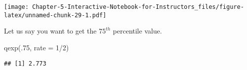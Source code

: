 \documentclass[
]{article}
\newenvironment{Shaded}{\begin{snugshade}}{\end{snugshade}}
\newcommand{\AttributeTok}[1]{\textcolor[rgb]{0.77,0.63,0.00}{#1}}
\newcommand{\DecValTok}[1]{\textcolor[rgb]{0.00,0.00,0.81}{#1}}
\newcommand{\FunctionTok}[1]{\textcolor[rgb]{0.00,0.00,0.00}{#1}}
\newcommand{\NormalTok}[1]{#1}
\newcommand{\SpecialCharTok}[1]{\textcolor[rgb]{0.00,0.00,0.00}{#1}}
\begin{document}
\texttt{[image: Chapter-5-Interactive-Notebook-for-Instructors\_files/figure-latex/unnamed-chunk-29-1.pdf]}

Let us say you want to get the \(75^{th}\) percentile value.

\begin{Shaded}
\begin{Highlighting}[]
\FunctionTok{qexp}\NormalTok{(.}\DecValTok{75}\NormalTok{, }\AttributeTok{rate =} \DecValTok{1}\SpecialCharTok{/}\DecValTok{2}\NormalTok{)}
\end{Highlighting}
\end{Shaded}

\begin{verbatim}
## [1] 2.773
\end{verbatim}
\end{document}
